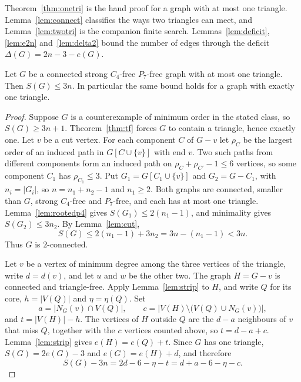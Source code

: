 \documentclass[ASNA]{USG}
\theoremstyle{WBstyletwo}
\numberwithin{equation}{section}
\begin{document}
Theorem~\ref{thm:onetri} is the hand proof for a graph with at most one triangle. Lemma~\ref{lem:connect} classifies the ways two triangles can meet, and Lemma~\ref{lem:twotri} is the companion finite search. Lemmas~\ref{lem:deficit}, \ref{lem:e2n} and~\ref{lem:delta2} bound the number of edges through the deficit $\Delta(G)=2n-3-e(G)$.

\begin{theorem}\label{thm:onetri}
Let $G$ be a connected strong $C_4$-free $P_7$-free graph with at most one triangle. Then $S(G)\le 3n$. In particular the same bound holds for a graph with exactly one triangle.
\end{theorem}

\begin{proof}
Suppose $G$ is a counterexample of minimum order in the stated class, so $S(G)\ge 3n+1$. Theorem~\ref{thm:tf} forces $G$ to contain a triangle, hence exactly one. Let $v$ be a cut vertex. For each component $C$ of $G-v$ let $\rho_C$ be the largest order of an induced path in $G[C\cup\{v\}]$ with end $v$. Two such paths from different components form an induced path on $\rho_C+\rho_{C'}-1\le 6$ vertices, so some component $C_1$ has $\rho_{C_1}\le 3$. Put $G_1=G[C_1\cup\{v\}]$ and $G_2=G-C_1$, with $n_i=|G_i|$, so $n=n_1+n_2-1$ and $n_1\ge 2$. Both graphs are connected, smaller than $G$, strong $C_4$-free and $P_7$-free, and each has at most one triangle. Lemma~\ref{lem:rootedp4} gives $S(G_1)\le 2(n_1-1)$, and minimality gives $S(G_2)\le 3n_2$. By Lemma~\ref{lem:cut},
\[
S(G)\le 2(n_1-1)+3n_2=3n-(n_1-1)<3n.
\]
Thus $G$ is $2$-connected.

Let $v$ be a vertex of minimum degree among the three vertices of the triangle, write $d=d(v)$, and let $u$ and $w$ be the other two. The graph $H=G-v$ is connected and triangle-free. Apply Lemma~\ref{lem:strip} to $H$, and write $Q$ for its core, $h=|V(Q)|$ and $\eta=\eta(Q)$. Set
\[
a=\bigl|N_G(v)\cap V(Q)\bigr|,\qquad
c=\bigl|V(H)\setminus\bigl(V(Q)\cup N_G(v)\bigr)\bigr|,
\]
and $t=|V(H)|-h$. The vertices of $H$ outside $Q$ are the $d-a$ neighbours of $v$ that miss $Q$, together with the $c$ vertices counted above, so $t=d-a+c$. Lemma~\ref{lem:strip} gives $e(H)=e(Q)+t$. Since $G$ has one triangle, $S(G)=2e(G)-3$ and $e(G)=e(H)+d$, and therefore
\begin{equation}\label{eq:onetri}
S(G)-3n=2d-6-\eta-t=d+a-6-\eta-c.
\end{equation}


\end{proof}
\end{document}

